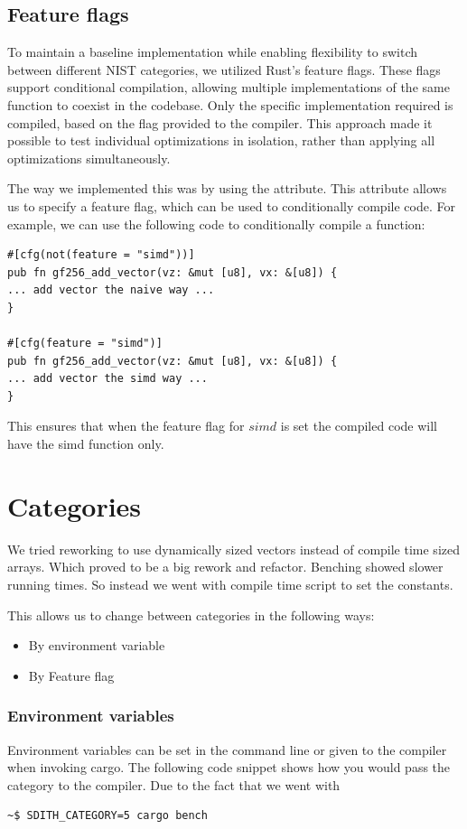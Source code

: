 \documentclass[twoside,11pt]{report}
\theoremstyle{definition}
\theoremstyle{plain}
\begin{document}
\subsection{Feature flags}\label{sub:feature_flags} %
To maintain a baseline implementation while enabling flexibility to switch between different NIST categories, we utilized Rust's feature flags. These flags support conditional compilation, allowing multiple implementations of the same function to coexist in the codebase. Only the specific implementation required is compiled, based on the flag provided to the compiler. This approach made it possible to test individual optimizations in isolation, rather than applying all optimizations simultaneously.

The way we implemented this was by using the  attribute. This attribute allows us to specify a feature flag, which can be used to conditionally compile code. For example, we can use the following code to conditionally compile a function:
\begin{verbatim}
#[cfg(not(feature = "simd"))]
pub fn gf256_add_vector(vz: &mut [u8], vx: &[u8]) {
... add vector the naive way ...
}

#[cfg(feature = "simd")]
pub fn gf256_add_vector(vz: &mut [u8], vx: &[u8]) {
... add vector the simd way ...
}
\end{verbatim}
This ensures that when the feature flag for $simd$ is set the compiled code will have the simd function only.

\section{Categories}\label{sub:categories} %
We tried reworking to use dynamically sized vectors instead of compile time sized arrays. Which proved to be a big rework and refactor. Benching showed slower running times. So instead we went with compile time script to set the constants.

This allows us to change between categories in the following ways:
\begin{itemize}
  \item By environment variable
  \item By Feature flag
\end{itemize}

\subsubsection{Environment variables}\label{sub:env_vars}
Environment variables can be set in the command line or given to the compiler when invoking cargo. The following code snippet shows how you would pass the category to the compiler. Due to the fact that we went with
\begin{verbatim}
~$ SDITH_CATEGORY=5 cargo bench
\end{verbatim}
\end{document}
